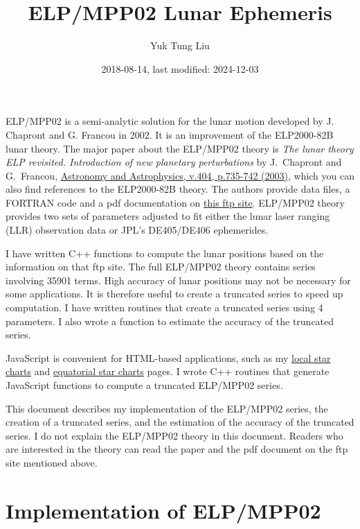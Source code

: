 \documentclass[12pt]{article}
\begin{document}
\title{ELP/MPP02 Lunar Ephemeris}
\author{Yuk Tung Liu}
\date{2018-08-14, last modified: 2024-12-03}
\maketitle

ELP/MPP02 is a semi-analytic solution for the lunar motion developed by 
J. Chapront and G. Francou in 2002. It is an improvement of the ELP2000-82B 
lunar theory. The major paper about the ELP/MPP02 theory is 
{\it The lunar theory ELP revisited. 
Introduction of new planetary perturbations} by J.\ Chapront and G.\ Francou, 
\href{https://ui.adsabs.harvard.edu/abs/2003A%26A...404..735C/abstract}{Astronomy and Astrophysics, 
v.404, p.735-742 (2003)}, which you can also find references to the ELP2000-82B 
theory. The authors provide data files, a FORTRAN code and a 
pdf documentation on \href{ftp://cyrano-se.obspm.fr/pub/2_lunar_solutions/2_elpmpp02/}{this 
ftp site}. ELP/MPP02 theory provides two sets of parameters adjusted to fit 
either the lunar laser ranging (LLR) observation data or JPL's DE405/DE406 
ephemerides.

I have written C++ functions to compute the lunar positions based on  
the information on that ftp site. The full ELP/MPP02 theory contains 
series involving 35901 terms. High accuracy of lunar positions 
may not be necessary for some applications. It is therefore useful to create 
a truncated series to speed up computation. I have written routines 
that create a truncated series using 4 parameters. I 
also wrote a function to estimate the accuracy of the truncated series. 

JavaScript is convenient for HTML-based applications, such as my
\href{https://ytliu0.github.io/starCharts/}{local star charts} and
\href{https://ytliu0.github.io/starCharts/chartGCRS_min.html}{equatorial star
charts} pages. I wrote C++ routines that generate JavaScript functions to compute a truncated ELP/MPP02 series.

This document describes my implementation of the ELP/MPP02 series, 
the creation of a truncated series, and the estimation of the accuracy 
of the truncated series. I do not explain the ELP/MPP02 theory in this 
document. Readers who are interested in the theory can read the paper and 
the pdf document on the ftp site mentioned above.

\section{Implementation of ELP/MPP02} 
\end{document}
